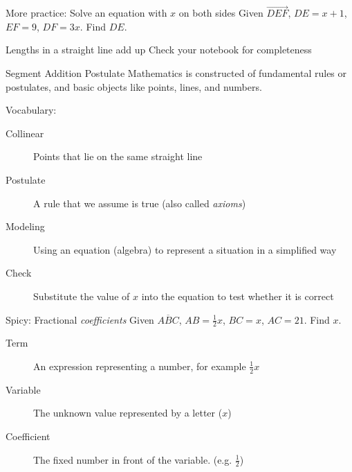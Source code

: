 \begin{frame}{More practice: Solve an equation with $x$ on both sides}
  Given $\overrightarrow{DEF}$, $DE=x+1$, $EF=9$, $DF=3x$. Find ${DE}$. \vspace{1cm}
  \begin{center}   
  \end{center} \vspace{3cm}
  \end{frame}

\begin{frame}{Lengths in a straight line add up}
  {Check your notebook for completeness}
  \begin{block}{Segment Addition Postulate}
    Mathematics is constructed of fundamental rules or postulates, and basic objects like points, lines, and numbers.
  \end{block} \vspace{1cm}
    Vocabulary:
    \begin{description}
      \item[Collinear] Points that lie on the same straight line
      \item[Postulate] A rule that we assume is true (also called \emph{axioms})
      \item[Modeling] Using an equation (algebra) to represent a situation in a simplified way
      \item[Check] Substitute the value of $x$ into the equation to test whether it is correct
    \end{description}
  \end{frame}

\begin{frame}{Spicy: Fractional \emph{coefficients}}
  Given $\overline{ABC}$, $AB=\frac{1}{2}x$, $BC=x$, $AC=21$. Find ${x}$.\vspace{1cm}
  \begin{center}   
  \end{center} \vspace{3cm}
  \begin{description}
    \item[Term] An expression representing a number, for example $\frac{1}{2}x$
    \item[Variable] The unknown value represented by a letter ($x$)
    \item[Coefficient] The fixed number in front of the variable. (e.g. $\frac{1}{2}$) 
    \end{description}
  \end{frame}

